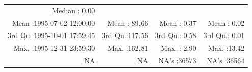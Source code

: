 \documentclass[
  10pt,
  a4paper,oneside]{article}
\begin{document}
\begin{longtable}[]{@{}rrrr@{}}
\begin{minipage}[t]{0.18\columnwidth}
Median : 0.00\strut
\end{minipage}\tabularnewline
\begin{minipage}[t]{0.34\columnwidth}\raggedleft
Mean :1995-07-02 12:00:00\strut
\end{minipage} & \begin{minipage}[t]{0.19\columnwidth}\raggedleft
Mean : 89.66\strut
\end{minipage} & \begin{minipage}[t]{0.18\columnwidth}\raggedleft
Mean : 0.37\strut
\end{minipage} & \begin{minipage}[t]{0.18\columnwidth}\raggedleft
Mean : 0.02\strut
\end{minipage}\tabularnewline
\begin{minipage}[t]{0.34\columnwidth}\raggedleft
3rd Qu.:1995-10-01 17:59:45\strut
\end{minipage} & \begin{minipage}[t]{0.19\columnwidth}\raggedleft
3rd Qu.:117.56\strut
\end{minipage} & \begin{minipage}[t]{0.18\columnwidth}\raggedleft
3rd Qu.: 0.58\strut
\end{minipage} & \begin{minipage}[t]{0.18\columnwidth}\raggedleft
3rd Qu.: 0.01\strut
\end{minipage}\tabularnewline
\begin{minipage}[t]{0.34\columnwidth}\raggedleft
Max. :1995-12-31 23:59:30\strut
\end{minipage} & \begin{minipage}[t]{0.19\columnwidth}\raggedleft
Max. :162.81\strut
\end{minipage} & \begin{minipage}[t]{0.18\columnwidth}\raggedleft
Max. : 2.90\strut
\end{minipage} & \begin{minipage}[t]{0.18\columnwidth}\raggedleft
Max. :13.42\strut
\end{minipage}\tabularnewline
\begin{minipage}[t]{0.34\columnwidth}\raggedleft
NA\strut
\end{minipage} & \begin{minipage}[t]{0.19\columnwidth}\raggedleft
NA\strut
\end{minipage} & \begin{minipage}[t]{0.18\columnwidth}\raggedleft
NA's :36573\strut
\end{minipage} & \begin{minipage}[t]{0.18\columnwidth}\raggedleft
NA's :36564\strut
\end{minipage}\tabularnewline
\bottomrule
\end{longtable}
\end{document}
